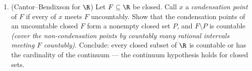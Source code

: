 \begin{problem}
\begin{enumerate}[resume]
        isolated point, and exhibit one where the isolated
        points are  but not everything: $K = \{0\} \cup
        \{\frac1n : n \geq 1\}$.
  \item (Cantor--Bendixson for $\R$) Let $F \subseteq \R$ be
        closed. Call $x$ a \emph{condensation point} of $F$ if
        every  of $x$ meets $F$ uncountably. Show
        that the condensation points of an uncountable closed
        $F$ form a nonempty  closed set $P$, and $F
        \setminus P$ is countable \emph{(cover the
        non-condensation points by countably many rational
        intervals meeting $F$ countably)}. Conclude: every
        closed subset of $\R$ is countable or has the
        cardinality of the continuum --- the continuum
        hypothesis holds for closed sets.
\end{enumerate}


\end{problem}

